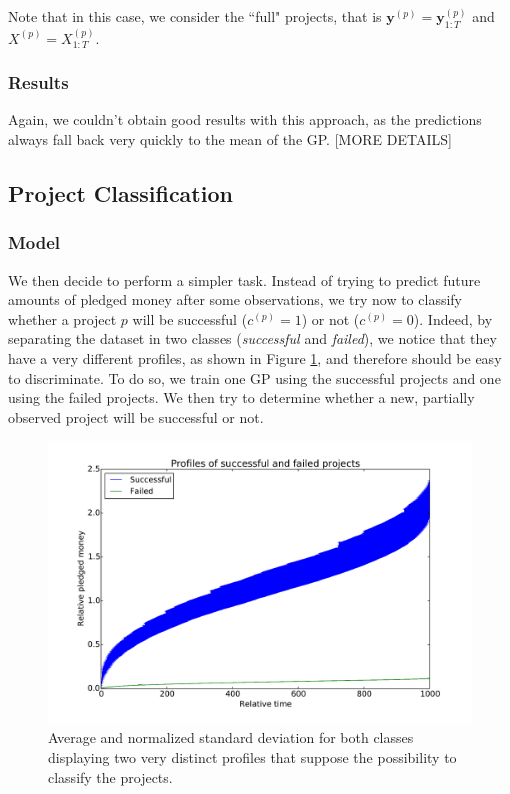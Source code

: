 \documentclass[11pt, oneside]{article}   	%
\begin{document}
                        Note that in this case, we consider the ``full" projects, that is $\mathbf{y}^{(p)} = \mathbf{y}_{1:T}^{(p)}$ and $X^{(p)} = X_{1:T}^{(p)}$.
                        
         	\subsubsection*{Results}
        			Again, we couldn't obtain good results with this approach, as the predictions always fall back very quickly to the mean of the GP. [MORE DETAILS]
        
         \subsection{Project Classification}
         	\subsubsection*{Model}
            		We then decide to perform a simpler task. Instead of trying to predict future amounts of pledged money after some observations, we try now to classify whether a project $p$ will be successful ($c^{(p)} = 1$) or not ($c^{(p)} = 0$). Indeed, by separating the dataset in two classes (\textit{successful} and \textit{failed}), we notice that they have a very different profiles, as shown in Figure \ref{fig:two_profiles}, and therefore should be easy to discriminate. To do so, we train one GP using the successful projects and one using the failed projects. We then try to determine whether a new, partially observed project will be successful or not. 
			\begin{figure}[h]
                        		\begin{center}
                        			\includegraphics[scale=0.5]{img/two_profiles.pdf}
                        			\caption{Average and normalized standard deviation for both classes displaying two very distinct profiles that suppose the possibility to classify the projects.}
                       		 	\label{fig:two_profiles}
                       	 	\end{center}
                        	\end{figure}
\end{document}
